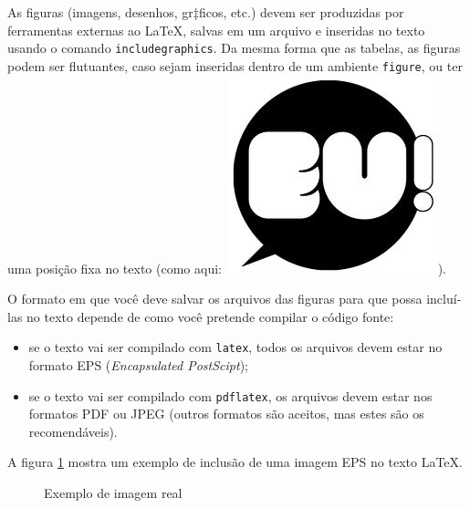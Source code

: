 As figuras (imagens, desenhos, gr‡ficos, etc.) devem ser produzidas
por ferramentas externas ao \LaTeX, salvas em um arquivo e inseridas
no texto usando o comando \texttt{includegraphics}. Da mesma forma
que as tabelas, as figuras podem ser flutuantes, caso sejam
inseridas dentro de um ambiente \texttt{figure}, ou ter uma posição
fixa no texto (como aqui: \includegraphics{figuras/eu}).

O formato em que você deve salvar os arquivos das figuras para que
possa incluí-las no texto depende de como você pretende compilar
o código fonte:
\begin{itemize}
\item se o texto vai ser compilado com \texttt{latex}, todos os
arquivos devem estar no formato EPS (\emph{Encapsulated PostScipt});
\item se o texto vai ser compilado com \texttt{pdflatex}, os
arquivos devem estar nos formatos PDF ou JPEG (outros formatos são
aceitos, mas estes são os recomendáveis).
\end{itemize}

A figura \ref{Fig:belmonte} mostra um exemplo de inclusão de uma
imagem EPS no texto \LaTeX.

\begin{figure}[htbp!]
\begin{center}
\caption{Exemplo de imagem real}
\label{Fig:belmonte}
\end{center} 
\end{figure}



